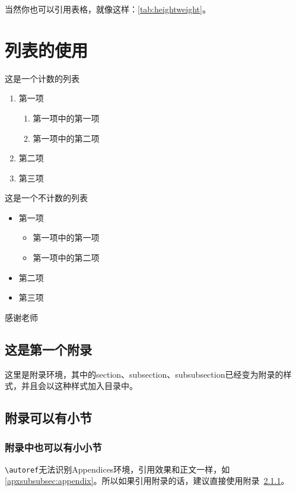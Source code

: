 \documentclass[supercite]{HustGraduPaper}
\begin{document}
	当然你也可以引用表格，就像这样：\autoref{tab:heightweight}。
	
	\section{列表的使用}
	这是一个计数的列表
	\begin{enumerate}
		\item 第一项
		\begin{enumerate}
			\item 第一项中的第一项
			\item 第一项中的第二项
		\end{enumerate}
		\item 第二项
		\item 第三项
	\end{enumerate}
	
	这是一个不计数的列表
	\begin{itemize}
		\item 第一项
		\begin{itemize}
			\item 第一项中的第一项
			\item 第一项中的第二项
		\end{itemize}
		\item 第二项
		\item 第三项
	\end{itemize}
	
	\begin{thankpage}
		感谢老师
	\end{thankpage}
	
	
	
	\begin{appendices}
		\section{这是第一个附录}
		这里是附录环境，其中的section、subsection、subsubsection已经变为附录的样式，并且会以这种样式加入目录中。
		\subsection{附录可以有小节}
		\subsubsection{附录中也可以有小小节}\label{apxsubsubsec:appendix}
		\verb|\autoref|无法识别Appendices环境，引用效果和正文一样，如\autoref{apxsubsubsec:appendix}。所以如果引用附录的话，建议直接使用附录~\ref{apxsubsubsec:appendix}。
	\end{appendices}
	
\end{document}

